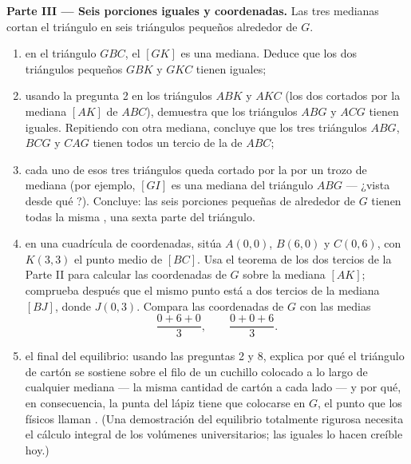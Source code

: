 \begin{problem}
\medskip
\noindent\textbf{Parte III --- Seis porciones iguales y coordenadas.}
Las tres medianas cortan el triángulo en seis triángulos pequeños
alrededor de $G$.
\begin{enumerate}[resume]
  \item en el triángulo $GBC$, el  $[GK]$ es una mediana.
        Deduce que los dos triángulos pequeños $GBK$ y $GKC$ tienen
         iguales;
  \item usando la pregunta 2 en los triángulos $ABK$ y $AKC$ (los dos
        cortados por la mediana $[AK]$ de $ABC$), demuestra que los
        triángulos $ABG$ y $ACG$ tienen  iguales. Repitiendo
        con otra mediana, concluye que los tres triángulos
        $ABG$, $BCG$ y $CAG$ tienen todos  un tercio de la de $ABC$;
  \item cada uno de esos tres triángulos queda cortado por la  por un trozo
        de mediana (por ejemplo, $[GI]$ es una mediana del
        triángulo $ABG$ --- ¿vista desde qué ?). Concluye: las seis
        porciones pequeñas de alrededor de $G$ tienen todas la misma , una sexta parte
        del triángulo.
  \item en una cuadrícula de coordenadas, sitúa $A(0, 0)$, $B(6, 0)$ y
        $C(0, 6)$, con $K(3, 3)$ el punto medio de $[BC]$. Usa el
        teorema de los dos tercios de la Parte II para calcular las coordenadas
        de $G$ sobre la mediana $[AK]$; comprueba después que el mismo
        punto está a dos tercios de la mediana $[BJ]$, donde
        $J(0, 3)$. Compara las coordenadas de $G$ con las medias
        \[
        \frac{0 + 6 + 0}{3},
        \qquad
        \frac{0 + 0 + 6}{3} .
        \]
  \item el final del equilibrio: usando las preguntas 2 y 8, explica por qué
        el triángulo de cartón se sostiene sobre el filo de un cuchillo colocado
        a lo largo de cualquier mediana --- la misma cantidad de cartón a cada
        lado --- y por qué, en consecuencia, la punta del lápiz tiene que colocarse
        en $G$, el punto que los físicos llaman . (Una demostración del equilibrio totalmente rigurosa necesita el
        cálculo integral de los volúmenes universitarios; las 
        iguales lo hacen creíble hoy.)
\end{enumerate}
\end{problem}
